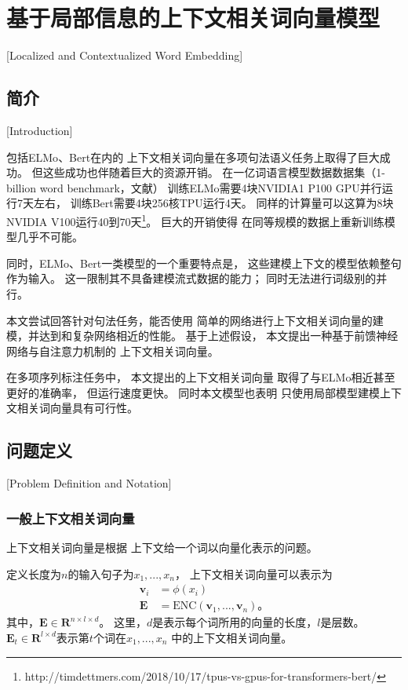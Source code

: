 \chapter{基于局部信息的上下文相关词向量模型}[Localized and Contextualized Word Embedding]\label{chp:elmo}

\section{简介}[Introduction]

包括ELMo\cite{peters-EtAl:2018:N18-1}、Bert\cite{DBLP:journals/corr/abs-1810-04805}在内的
上下文相关词向量在多项句法语义任务上取得了巨大成功。
但这些成功也伴随着巨大的资源开销。
在一亿词语言模型数据数据集（1-billion word benchmark，文献\cite{DBLP:conf/interspeech/ChelbaMSGBKR14}）
训练ELMo需要4块NVIDIA1 P100 GPU并行运行7天左右，
训练Bert需要4块256核TPU运行4天。
同样的计算量可以这算为8块NVIDIA V100运行40到70天\footnote{http://timdettmers.com/2018/10/17/tpus-vs-gpus-for-transformers-bert/}。
巨大的开销使得
在同等规模的数据上重新训练模型几乎不可能。

同时，ELMo、Bert一类模型的一个重要特点是，
这些建模上下文的模型依赖整句作为输入。
这一限制其不具备建模流式数据的能力；
同时无法进行词级别的并行。

本文尝试回答针对句法任务，能否使用
简单的网络进行上下文相关词向量的建模，并达到和复杂网络相近的性能。
基于上述假设，
本文提出一种基于前馈神经网络与自注意力机制的
上下文相关词向量。

在多项序列标注任务中，
本文提出的上下文相关词向量
取得了与ELMo相近甚至更好的准确率，
但运行速度更快。
同时本文模型也表明
只使用局部模型建模上下文相关词向量具有可行性。

\section{问题定义}[Problem Definition and Notation]

\subsection{一般上下文相关词向量}

上下文相关词向量是根据
上下文给一个词以向量化表示的问题。

定义长度为$n$的输入句子为$x_1, ..., x_n$，
上下文相关词向量可以表示为
\begin{align*}
\mathbf{v}_i &= \phi(x_i)  \\
\mathbf{E} &= \text{ENC}(\mathbf{v}_1, ..., \mathbf{v}_n)\text{。}
\end{align*}
其中，$\mathbf{E} \in \mathbf{R}^{n \times l \times d}$。
这里，$d$是表示每个词所用的向量的长度，$l$是层数。
$\mathbf{E}_t \in \mathbf{R}^{l\times d}$表示第$t$个词在$x_1, ..., x_n$
中的上下文相关词向量。

